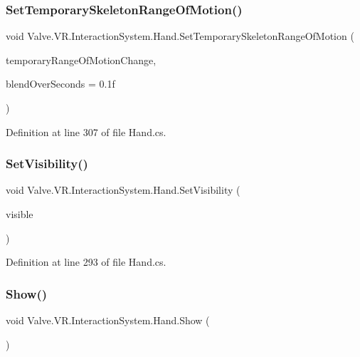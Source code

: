 \subsubsection{\texorpdfstring{SetTemporarySkeletonRangeOfMotion()}{SetTemporarySkeletonRangeOfMotion()}}
{\footnotesize\ttfamily void Valve.\+V\+R.\+Interaction\+System.\+Hand.\+Set\+Temporary\+Skeleton\+Range\+Of\+Motion (\begin{DoxyParamCaption}\item[{\mbox{\hyperlink{namespace_valve_1_1_v_r_aabb506007a41244de5c315ff5519439f}{Skeletal\+Motion\+Range\+Change}}}]{temporary\+Range\+Of\+Motion\+Change,  }\item[{float}]{blend\+Over\+Seconds = {\ttfamily 0.1f} }\end{DoxyParamCaption})}



Definition at line 307 of file Hand.\+cs.

\mbox{\label{class_valve_1_1_v_r_1_1_interaction_system_1_1_hand_aa0c76c11d150d1aa4e0dca00303fe07e}} 
\subsubsection{\texorpdfstring{SetVisibility()}{SetVisibility()}}
{\footnotesize\ttfamily void Valve.\+V\+R.\+Interaction\+System.\+Hand.\+Set\+Visibility (\begin{DoxyParamCaption}\item[{bool}]{visible }\end{DoxyParamCaption})}



Definition at line 293 of file Hand.\+cs.

\mbox{\label{class_valve_1_1_v_r_1_1_interaction_system_1_1_hand_af3c098e17efc4697374e3ec76d80b45c}} 
\subsubsection{\texorpdfstring{Show()}{Show()}}
{\footnotesize\ttfamily void Valve.\+V\+R.\+Interaction\+System.\+Hand.\+Show (\begin{DoxyParamCaption}{ }\end{DoxyParamCaption})}



